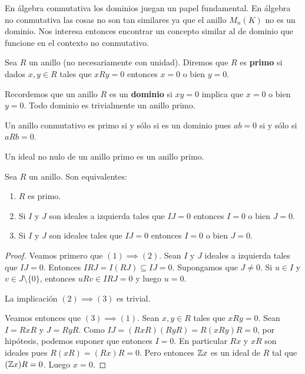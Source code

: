 
En álgebra conmutativa los dominios juegan un papel fundamental. En álgebra no
conmutativa las cosas no son tan similares ya que el anillo $M_n(K)$ no es un
dominio. Nos interesa entonces encontrar un concepto similar al de dominio que
funcione en el contexto no conmutativo.

\begin{definition}
	Sea $R$ un anillo (no necesariamente con unidad). Diremos que $R$ es
	\textbf{primo} si dados $x,y\in R$ tales que $xRy=0$ entonces $x=0$ o bien
	$y=0$.
\end{definition}

\begin{example}
	Recordemos que un anillo $R$ es un \textbf{dominio} si $xy=0$ implica que
	$x=0$ o bien $y=0$.  Todo dominio es trivialmente un anillo primo.
\end{example}

\begin{example}
	Un anillo conmutativo es primo si y sólo si es un dominio pues $ab=0$ si y
	sólo si $aRb=0$.
\end{example}

\begin{example}
	Un ideal no nulo de un anillo primo es un anillo primo.
\end{example}

\begin{lemma}
	Sea $R$ un anillo. Son equivalentes:
	\begin{enumerate}
		\item $R$ es primo.
		\item Si $I$ y $J$ son ideales a izquierda tales que $IJ=0$ entonces
			$I=0$ o bien $J=0$.
		\item Si $I$ y $J$ son ideales tales que $IJ=0$ entonces $I=0$ o bien
			$J=0$.
	\end{enumerate}
\end{lemma}

\begin{proof}
	Veamos primero que $(1)\implies(2)$. Sean $I$ y $J$ ideales a izquierda
	tales que $IJ=0$. Entonces $IRJ=I(RJ)\subseteq IJ=0$. Supongamos que $J\ne
	0$. Si $u\in I$ y $v\in J\setminus\{0\}$, entonces $uRv\in IRJ=0$ y luego
	$u=0$.

	La implicación $(2)\implies(3)$ es trivial. 

	Veamos entonces que $(3)\implies(1)$. Sean $x,y\in R$ tales que $xRy=0$.
	Sean $I=RxR$ y $J=RyR$. Como $IJ=(RxR)(RyR)=R(xRy)R=0$, por hipótesis,
	podemos suponer que entonces $I=0$. En particular $Rx$ y $xR$ son ideales
	pues $R(xR)=(Rx)R=0$. Pero entonces $\mathbb{Z} x$ es un ideal de $R$ tal que $(\mathbb{Z} x)R=0$. Luego $x=0$. 
\end{proof}

